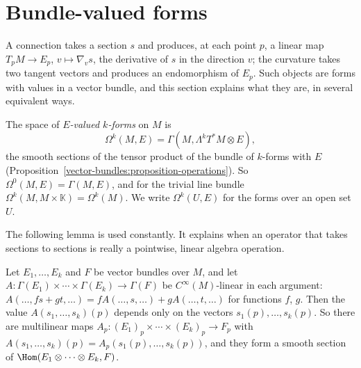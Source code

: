 \section{Bundle-valued forms}\label{connections:section-bundle-valued-forms}

A connection takes a section $s$ and produces, at each point $p$, a linear map $T_pM \to E_p$, $v \mapsto \nabla_vs$, the derivative of $s$ in the direction $v$; the curvature
takes two tangent vectors and produces an endomorphism of $E_p$. Such objects are forms with values in a vector bundle, and this section explains what they are, in several
equivalent ways.

\begin{definition}\label{connections:definition-bundle-valued-forms}
The space of \emph{$E$-valued $k$-forms} on $M$ is
\[
\Omega^k(M, E) = \Gamma(M, \Lambda^kT^*M \otimes E),
\]
the smooth sections of the tensor product of the bundle of $k$-forms with $E$ (Proposition~\ref{vector-bundles:proposition-operations}). So $\Omega^0(M, E) = \Gamma(M, E)$,
and for the trivial line bundle $\Omega^k(M, M \times \mathbb{K}) = \Omega^k(M)$. We write $\Omega^k(U, E)$ for the forms over an open set $U$.
\end{definition}

The following lemma is used constantly. It explains when an operator that takes sections to sections is really a pointwise, linear algebra operation.

\begin{lemma}[Tensoriality]\label{connections:lemma-tensoriality}
Let $E_1, \ldots, E_k$ and $F$ be vector bundles over $M$, and let $A \colon \Gamma(E_1) \times \cdots \times \Gamma(E_k) \to \Gamma(F)$ be $C^\infty(M)$-linear in each
argument: $A(\ldots, fs + gt, \ldots) = fA(\ldots, s, \ldots) + gA(\ldots, t, \ldots)$ for functions $f$, $g$. Then the value $A(s_1, \ldots, s_k)(p)$ depends only on the
vectors $s_1(p), \ldots, s_k(p)$. So there are multilinear maps $A_p \colon (E_1)_p \times \cdots \times (E_k)_p \to F_p$ with $A(s_1, \ldots, s_k)(p) = A_p(s_1(p), \ldots, s_k(p))$,
and they form a smooth section of $\Hom(E_1 \otimes \cdots \otimes E_k, F)$.
\end{lemma}

